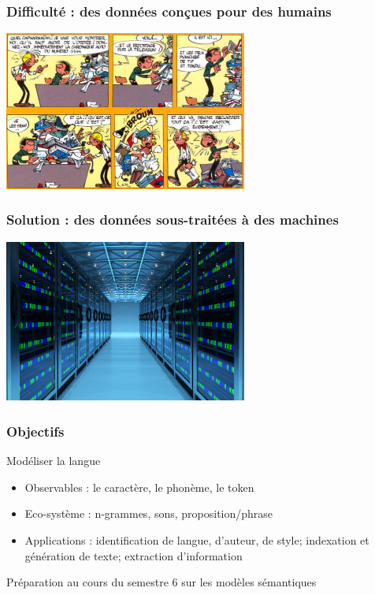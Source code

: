 \begin{frame}
  \frametitle{Difficulté : des données conçues pour des humains}
  \begin{block}{}
    \includegraphics[width=8cm]{images/gaston.jpg}
  \end{block}
\end{frame}

\begin{frame}
  \frametitle{Solution : des données sous-traitées à des machines}
  \begin{block}{}
    \includegraphics[width=8cm]{images/datacenter1.jpg}
  \end{block}
\end{frame}


\begin{frame}
\frametitle{Objectifs}

\begin{block}{Modéliser la langue}

\begin{itemize}
  \item Observables : le caractère, le phonème, le token
  \item Eco-système : n-grammes, sons, proposition/phrase
  \item Applications : identification de langue, d'auteur, de style; indexation et génération de texte; extraction d'information
\end{itemize}
  Préparation au cours du semestre 6 sur les modèles sémantiques
\end{block}
\end{frame}
